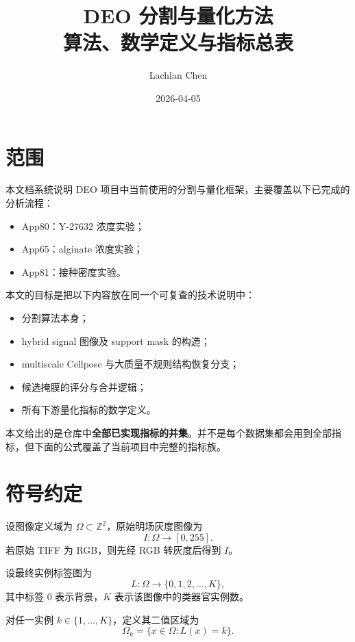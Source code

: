 \documentclass[11pt]{article}
\title{DEO 分割与量化方法\\算法、数学定义与指标总表}
\author{Lachlan Chen}
\date{2026-04-05}
\newcommand{\1}{\mathbf{1}}
\newcommand{\gray}{I}
\newcommand{\labelmap}{L}
\begin{document}
\maketitle
\tableofcontents

\section{范围}
本文档系统说明 DEO 项目中当前使用的分割与量化框架，主要覆盖以下已完成的分析流程：
\begin{itemize}[leftmargin=1.5em]
  \item App80：Y-27632 浓度实验；
  \item App65：alginate 浓度实验；
  \item App81：接种密度实验。
\end{itemize}

本文的目标是把以下内容放在同一个可复查的技术说明中：
\begin{itemize}[leftmargin=1.5em]
  \item 分割算法本身；
  \item hybrid signal 图像及 support mask 的构造；
  \item multiscale Cellpose 与大质量不规则结构恢复分支；
  \item 候选掩膜的评分与合并逻辑；
  \item 所有下游量化指标的数学定义。
\end{itemize}

本文给出的是仓库中\textbf{全部已实现指标的并集}。并不是每个数据集都会用到全部指标，但下面的公式覆盖了当前项目中完整的指标族。

\section{符号约定}
设图像定义域为 $\Omega \subset \mathbb{Z}^2$，原始明场灰度图像为
\begin{equation}
\gray: \Omega \to [0,255].
\end{equation}
若原始 TIFF 为 RGB，则先经 RGB 转灰度后得到 $\gray$。

设最终实例标签图为
\begin{equation}
\labelmap: \Omega \to \{0,1,2,\dots,K\},
\end{equation}
其中标签 $0$ 表示背景，$K$ 表示该图像中的类器官实例数。

对任一实例 $k \in \{1,\dots,K\}$，定义其二值区域为
\begin{equation}
\Omega_k = \{x \in \Omega : \labelmap(x)=k\}.
\end{equation}
\end{document}
